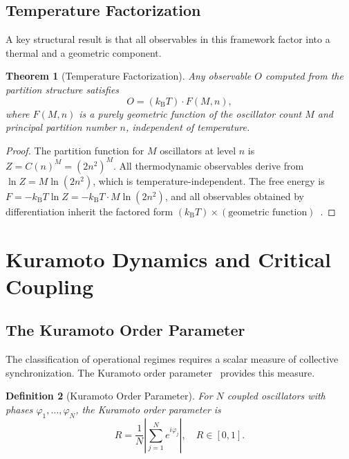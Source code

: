\documentclass[aps,prd,twocolumn,superscriptaddress,floatfix,nofootinbib]{revtex4-2}
\newtheorem{theorem}{Theorem}[section]
\newtheorem{definition}[theorem]{Definition}
\theoremstyle{remark}
\newcommand{\kB}{k_{\mathrm{B}}}
\newcommand{\Rorder}{R}
\begin{document}
\subsection{Temperature Factorization}

A key structural result is that all observables in this framework factor into a thermal and a geometric component.

\begin{theorem}[Temperature Factorization]
\label{thm:factorization}
Any observable $O$ computed from the partition structure satisfies
\begin{equation}
    \boxed{O = (\kB T) \cdot F(M, n),}
    \label{eq:factorization}
\end{equation}
where $F(M, n)$ is a purely geometric function of the oscillator count $M$ and principal partition number $n$, independent of temperature.
\end{theorem}

\begin{proof}
The partition function for $M$ oscillators at level $n$ is $Z = C(n)^M = (2n^2)^M$. All thermodynamic observables derive from $\ln Z = M \ln(2n^2)$, which is temperature-independent. The free energy is $F = -\kB T \ln Z = -\kB T \cdot M\ln(2n^2)$, and all observables obtained by differentiation inherit the factored form $(\kB T) \times (\text{geometric function})$~\cite{callen1985thermodynamics}.
\end{proof}

\section{Kuramoto Dynamics and Critical Coupling}
\label{sec:kuramoto}

\subsection{The Kuramoto Order Parameter}

The classification of operational regimes requires a scalar measure of collective synchronization. The Kuramoto order parameter~\cite{kuramoto1984chemical} provides this measure.

\begin{definition}[Kuramoto Order Parameter]
\label{def:kuramoto}
For $N$ coupled oscillators with phases $\varphi_1, \ldots, \varphi_N$, the Kuramoto order parameter is
\begin{equation}
    \boxed{\Rorder = \frac{1}{N} \left| \sum_{j=1}^{N} e^{i\varphi_j} \right|, \quad \Rorder \in [0, 1].}
    \label{eq:kuramoto_R}
\end{equation}
\end{definition}
\end{document}
